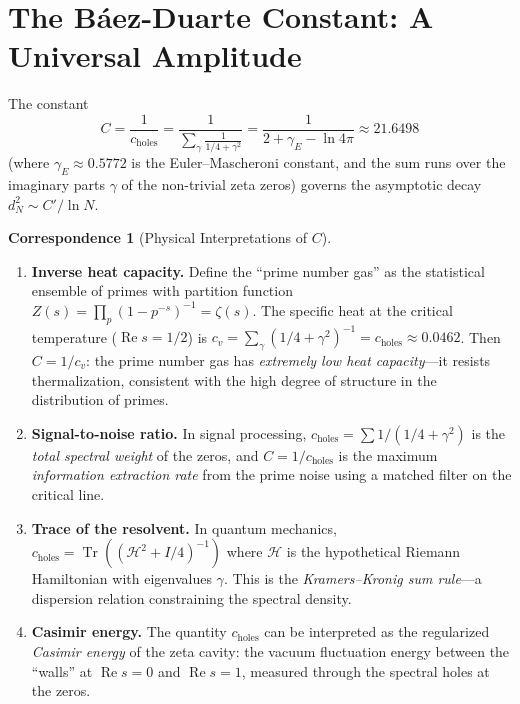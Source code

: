 \documentclass[11pt,a4paper]{article}
\theoremstyle{definition}
\newtheorem{correspondence}[definition]{Correspondence}
\newcommand{\re}{\operatorname{Re}}
\newcommand{\Tr}{\operatorname{Tr}}
\newcommand{\HH}{\mathcal{H}}
\begin{document}
\section{The B\'aez-Duarte Constant: A Universal Amplitude}
\label{sec:constant}

The constant
\[
  C = \frac{1}{c_{\text{holes}}}
  = \frac{1}{\displaystyle\sum_\gamma \frac{1}{1/4 + \gamma^2}}
  = \frac{1}{2 + \gamma_E - \ln 4\pi}
  \approx 21.6498
\]
(where $\gamma_E \approx 0.5772$ is the Euler--Mascheroni constant,
and the sum runs over the imaginary parts $\gamma$ of the non-trivial
zeta zeros) governs the asymptotic decay $d_N^2 \sim C'/\ln N$.

\begin{correspondence}[Physical Interpretations of $C$]
\label{corr:constant}
\begin{enumerate}
  \item \textbf{Inverse heat capacity.} Define the ``prime number gas''
    as the statistical ensemble of primes with partition function
    $Z(s) = \prod_p (1 - p^{-s})^{-1} = \zeta(s)$. The specific heat
    at the critical temperature ($\re s = 1/2$) is
    $c_v = \sum_\gamma (1/4 + \gamma^2)^{-1} = c_{\text{holes}} \approx 0.0462$.
    Then $C = 1/c_v$: the prime number gas has \emph{extremely low
    heat capacity}---it resists thermalization, consistent with the
    high degree of structure in the distribution of primes.

  \item \textbf{Signal-to-noise ratio.} In signal processing,
    $c_{\text{holes}} = \sum 1/(1/4 + \gamma^2)$ is the \emph{total
    spectral weight} of the zeros, and $C = 1/c_{\text{holes}}$ is
    the maximum \emph{information extraction rate} from the prime
    noise using a matched filter on the critical line.

  \item \textbf{Trace of the resolvent.} In quantum mechanics,
    $c_{\text{holes}} = \Tr((\HH^2 + I/4)^{-1})$ where $\HH$ is
    the hypothetical Riemann Hamiltonian with eigenvalues $\gamma$.
    This is the \emph{Kramers--Kronig sum rule}---a dispersion
    relation constraining the spectral density.

  \item \textbf{Casimir energy.} The quantity $c_{\text{holes}}$
    can be interpreted as the regularized \emph{Casimir energy} of
    the zeta cavity: the vacuum fluctuation energy between the
    ``walls'' at $\re s = 0$ and $\re s = 1$, measured through the
    spectral holes at the zeros.
\end{enumerate}
\end{correspondence}
\end{document}
